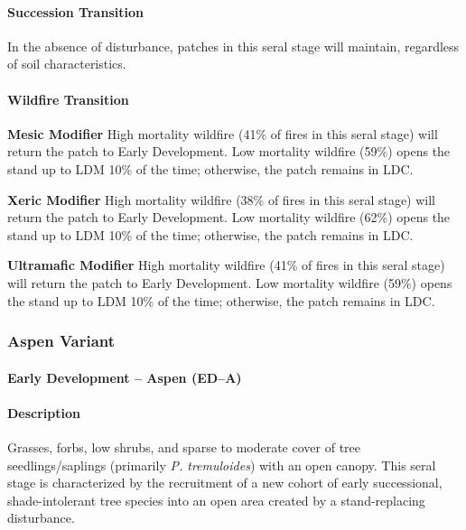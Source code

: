 \paragraph{Succession Transition} In the absence of disturbance, patches in this seral stage will maintain, regardless of soil characteristics.



\paragraph{Wildfire Transition}

\begin{adjustwidth}{2cm}{}
\noindent \textbf{Mesic Modifier } High mortality wildfire (41\% of fires in this seral stage) will return the patch to Early Development. Low mortality wildfire (59\%) opens the stand up to LDM 10\% of the time; otherwise, the patch remains in LDC. 

\medskip
\noindent \textbf{Xeric Modifier} High mortality wildfire (38\% of fires in this seral stage) will return the patch to Early Development. Low mortality wildfire (62\%) opens the stand up to LDM 10\% of the time; otherwise, the patch remains in LDC. 

\medskip
\noindent \textbf{Ultramafic Modifier} High mortality wildfire (41\% of fires in this seral stage) will return the patch to Early Development. Low mortality wildfire (59\%) opens the stand up to LDM 10\% of the time; otherwise, the patch remains in LDC.

\end{adjustwidth}

\noindent\hrulefill
\noindent\hrulefill

\subsubsection{Aspen Variant}

\paragraph{Early Development – Aspen (ED–A)}

\paragraph{Description} Grasses, forbs, low shrubs, and sparse to moderate cover of tree seedlings/saplings (primarily \emph{P. tremuloides}) with an open canopy. This seral stage is characterized by the recruitment of a new cohort of early successional, shade-intolerant tree species into an open area created by a stand-replacing disturbance. 

